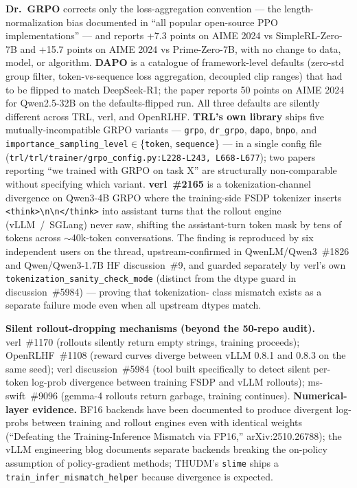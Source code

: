 \documentclass{article}
\begin{document}
\textbf{Dr.\ GRPO} \citep{liu2025drgrpo} corrects only the
loss-aggregation convention --- the length-normalization bias
documented in ``all popular open-source PPO implementations''
--- and reports +7.3 points on AIME 2024 vs SimpleRL-Zero-7B
and +15.7 points on AIME 2024 vs Prime-Zero-7B, with no change
to data, model, or algorithm. \textbf{DAPO}
\citep{yu2025dapo} is a catalogue of framework-level defaults
(zero-std group filter, token-vs-sequence loss aggregation,
decoupled clip ranges) that had to be flipped to match
DeepSeek-R1; the paper reports 50 points on AIME 2024 for
Qwen2.5-32B on the defaults-flipped run. All three defaults
are silently different across TRL, verl, and OpenRLHF.
\textbf{TRL's own library} ships five mutually-incompatible
GRPO variants --- \texttt{grpo}, \texttt{dr\_grpo},
\texttt{dapo}, \texttt{bnpo}, and
\texttt{importance\_sampling\_level}$\in$\{\texttt{token},
\texttt{sequence}\} --- in a single config file
(\texttt{trl/trl/trainer/grpo\_config.py:L228-L243,
L668-L677}); two papers reporting ``we trained with GRPO on
task X'' are structurally non-comparable without specifying
which variant. \textbf{verl~\#2165} \citep{verl2165} is a
tokenization-channel divergence on Qwen3-4B GRPO where the
training-side FSDP tokenizer inserts
\texttt{<think>\textbackslash n\textbackslash n</think>} into
assistant turns that the rollout engine (vLLM~/~SGLang) never
saw, shifting the assistant-turn token mask by tens of tokens
across $\sim$40k-token conversations. The finding is reproduced
by six independent users on the thread, upstream-confirmed in
QwenLM/Qwen3~\#1826 and Qwen/Qwen3-1.7B HF discussion~\#9, and
guarded separately by verl's own
\texttt{tokenization\_sanity\_check\_mode} (distinct from the
dtype guard in discussion~\#5984) --- proving that tokenization-%
class mismatch exists as a separate failure mode even when all
upstream dtypes match.

\textbf{Silent rollout-dropping mechanisms (beyond the 50-repo
audit).} verl~\#1170 (rollouts silently return empty strings,
training proceeds); OpenRLHF~\#1108 (reward curves diverge
between vLLM 0.8.1 and 0.8.3 on the same seed); verl
discussion~\#5984 (tool built specifically to detect silent
per-token log-prob divergence between training FSDP and vLLM
rollouts); ms-swift~\#9096 (gemma-4 rollouts return garbage,
training continues). \textbf{Numerical-layer evidence.} BF16
backends have been documented to produce divergent log-probs
between training and rollout engines even with identical
weights (``Defeating the Training-Inference Mismatch via
FP16,'' arXiv:2510.26788); the vLLM engineering blog documents
separate backends breaking the on-policy assumption of
policy-gradient methods; THUDM's \texttt{slime} ships a
\texttt{train\_infer\_mismatch\_helper} because divergence is
expected.
\end{document}
